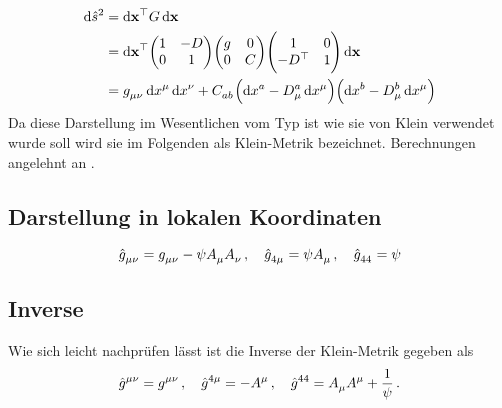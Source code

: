 \begin{equation}
\begin{split}
\dif \hat{s}^2&=\dif \vec{x}\transpose G
\dif \vec{x}\\
&=\dif \vec{x}\transpose
\begin{pmatrix}1& -D\\0& 1\end{pmatrix}
\begin{pmatrix}g& 0\\0& C
\end{pmatrix}
\begin{pmatrix}1& 0\\-D\transpose& 1\end{pmatrix}
\dif \vec{x}\\
&=\tensor{g}{_\mu_\nu}\dif \tensor{x}{^\mu}\dif\tensor{x}{^\nu}
+\tensor{C}{_a_b}\left(\dif\tensor{x}{^a}-\tensor*{D}{^a_\mu}\dif\tensor{x}{^\mu}\right)
\left(\dif\tensor{x}{^b}-\tensor*{D}{^b_\mu}\dif\tensor{x}{^\mu}\right)
\end{split}
\end{equation}
Da diese Darstellung im Wesentlichen vom Typ ist wie sie von Klein verwendet
wurde soll wird sie im Folgenden als Klein-Metrik bezeichnet. Berechnungen
angelehnt an \cite{Coquereaux:1990qs} \cite{williams2015field}.
\subsection{Darstellung in lokalen Koordinaten}
\begin{equation}
\tensor{\hat{g}}{_\mu_\nu}=\tensor{g}{_\mu_\nu}-\psi\tensor{A}{_\mu}\tensor{A}{_\nu}\,,\quad
\tensor{\hat{g}}{_4_\mu}=\psi\tensor{A}{_\mu}\,,\quad
\tensor{\hat{g}}{_4_4}=\psi
\end{equation}
\subsection{Inverse}
Wie sich leicht nachprüfen lässt ist die Inverse der Klein-Metrik gegeben als
\begin{equation}
\tensor{\hat{g}}{^\mu^\nu}=\tensor{g}{^\mu^\nu}\,,\quad
\tensor{\hat{g}}{^4^\mu}=-\tensor{A}{^\mu}\,,\quad
\tensor{\hat{g}}{^4^4}=\tensor{A}{_\mu}\tensor{A}{^\mu}+\frac{1}{\psi}\,.
\end{equation}
